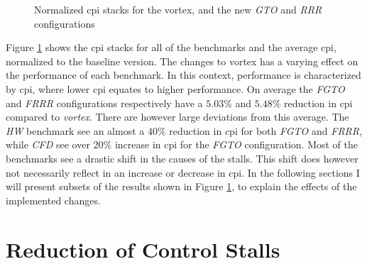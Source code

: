 \begin{figure}
    \centering
    \caption[Normalized \acrshort{cpi} stacks before and after the changes.]{Normalized \acrshort{cpi} stacks for the \Gls{vortex}, and the new \textit{GTO} and \textit{RRR} configurations}
    \label{fig:norm_cpi}
\end{figure}

Figure \ref{fig:norm_cpi} shows the \acrshort{cpi} stacks for all of the benchmarks and the average \acrshort{cpi}, normalized to the baseline version. The changes to \Gls{vortex} has a varying effect on the performance of each benchmark. In this context, performance is characterized by \acrshort{cpi}, where lower \acrshort{cpi} equates to higher performance. On average the \textit{FGTO} and \textit{FRRR}  configurations respectively have a $5.03\%$ and $5.48\%$ reduction in \acrshort{cpi} compared to \textit{\Gls{vortex}}. There are however large deviations from this average. The \textit{HW} benchmark see an almost a $40\%$ reduction in \acrshort{cpi} for both \textit{FGTO} and \textit{FRRR}, while \textit{CFD} see over $20\%$ increase in \acrshort{cpi} for the \textit{FGTO} configuration. Most of the benchmarks see a drastic shift in the causes of the stalls. This shift does however not necessarily reflect in an increase or decrease in \acrshort{cpi}. In the following sections I will present subsets of the results shown in Figure \ref{fig:norm_cpi}, to explain the effects of the implemented changes.

\newpage
\section{Reduction of Control Stalls} \label{sec:result_control_stalls}

